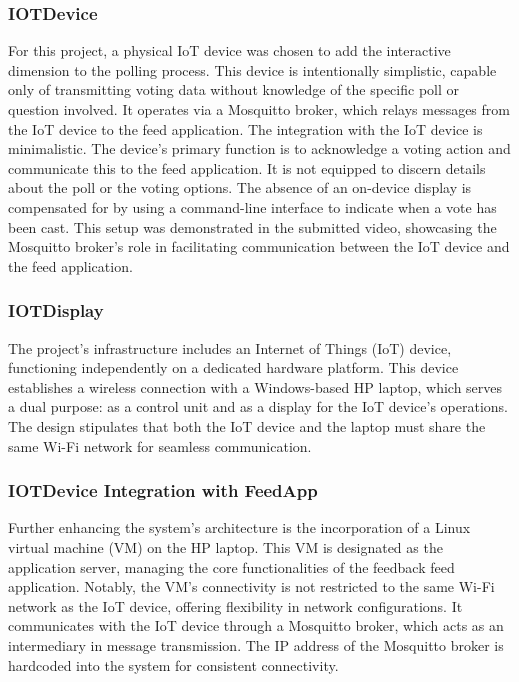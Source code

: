 \subsubsection{IOTDevice}
For this project, a physical IoT device was chosen to add the interactive dimension to the polling process.  This device is intentionally simplistic, capable only of transmitting voting data without knowledge of the specific poll or question involved.  It operates via a Mosquitto broker, which relays messages from the IoT device to the feed application. The integration with the IoT device is minimalistic. The device's primary function is to acknowledge a voting action and communicate this to the feed application. It is not equipped to discern details about the poll or the voting options. The absence of an on-device display is compensated for by using a command-line interface to indicate when a vote has been cast. This setup was demonstrated in the submitted video, showcasing the Mosquitto broker's role in facilitating communication between the IoT device and the feed application.

\subsubsection{IOTDisplay}
The project's infrastructure includes an Internet of Things (IoT) device, functioning independently on a dedicated hardware platform. This device establishes a wireless connection with a Windows-based HP laptop, which serves a dual purpose: as a control unit and as a display for the IoT device's operations. The design stipulates that both the IoT device and the laptop must share the same Wi-Fi network for seamless communication.

\subsubsection{IOTDevice Integration with FeedApp}
Further enhancing the system's architecture is the incorporation of a Linux virtual machine (VM) on the HP laptop. This VM is designated as the application server, managing the core functionalities of the feedback feed application. Notably, the VM's connectivity is not restricted to the same Wi-Fi network as the IoT device, offering flexibility in network configurations. It communicates with the IoT device through a Mosquitto broker, which acts as an intermediary in message transmission. The IP address of the Mosquitto broker is hardcoded into the system for consistent connectivity.

